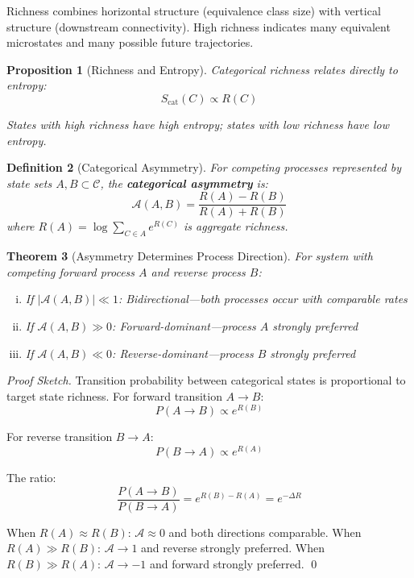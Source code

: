 \documentclass[11pt]{article}
\newtheorem{theorem}{Theorem}[section]
\newtheorem{definition}[theorem]{Definition}
\newtheorem{proposition}[theorem]{Proposition}
\theoremstyle{remark}
\begin{document}
Richness combines horizontal structure (equivalence class size) with vertical structure (downstream connectivity). High richness indicates many equivalent microstates and many possible future trajectories.

\begin{proposition}[Richness and Entropy]
\label{prop:richness_entropy}
Categorical richness relates directly to entropy:
\begin{equation}
S_{\text{cat}}(C) \propto R(C)
\end{equation}

States with high richness have high entropy; states with low richness have low entropy.
\end{proposition}

\begin{definition}[Categorical Asymmetry]
\label{def:asymmetry}
For competing processes represented by state sets $A, B \subset \mathcal{C}$, the \textbf{categorical asymmetry} is:
\begin{equation}
\mathcal{A}(A, B) = \frac{R(A) - R(B)}{R(A) + R(B)}
\end{equation}
where $R(A) = \log \sum_{C \in A} e^{R(C)}$ is aggregate richness.
\end{definition}

\begin{theorem}[Asymmetry Determines Process Direction]
\label{thm:asymmetry_direction}
For system with competing forward process $A$ and reverse process $B$:
\begin{enumerate}[(i)]
\item If $|\mathcal{A}(A,B)| \ll 1$: Bidirectional—both processes occur with comparable rates
\item If $\mathcal{A}(A,B) \gg 0$: Forward-dominant—process $A$ strongly preferred
\item If $\mathcal{A}(A,B) \ll 0$: Reverse-dominant—process $B$ strongly preferred
\end{enumerate}
\end{theorem}

\begin{proof}[Proof Sketch]
Transition probability between categorical states is proportional to target state richness. For forward transition $A \to B$:
\begin{equation}
P(A \to B) \propto e^{R(B)}
\end{equation}

For reverse transition $B \to A$:
\begin{equation}
P(B \to A) \propto e^{R(A)}
\end{equation}

The ratio:
\begin{equation}
\frac{P(A \to B)}{P(B \to A)} = e^{R(B) - R(A)} = e^{-\Delta R}
\end{equation}

When $R(A) \approx R(B)$: $\mathcal{A} \approx 0$ and both directions comparable.
When $R(A) \gg R(B)$: $\mathcal{A} \to 1$ and reverse strongly preferred.
When $R(B) \gg R(A)$: $\mathcal{A} \to -1$ and forward strongly preferred. \qed
\end{proof}
\end{document}
